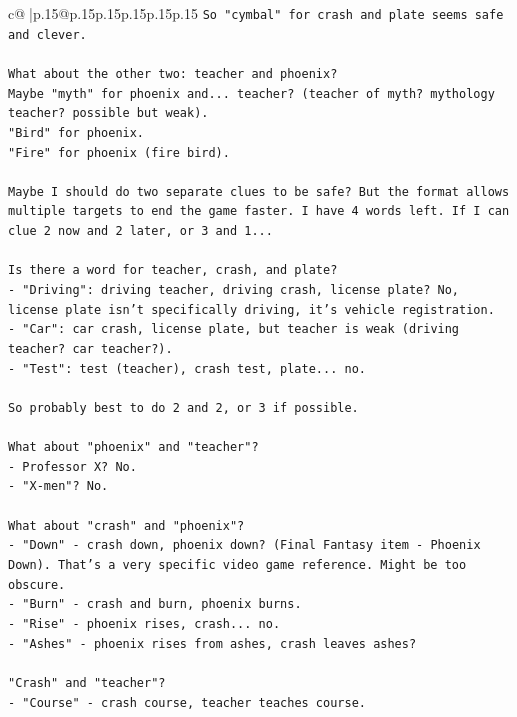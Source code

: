\documentclass{article}
\begin{document}
{\begin{supertabular}{c@{$\;$}|p{.15\linewidth}@{}p{.15\linewidth}p{.15\linewidth}p{.15\linewidth}p{.15\linewidth}p{.15\linewidth}}
{{{\texttt{So "cymbal" for crash and plate seems safe and clever.} \\
\\ 
\texttt{What about the other two: teacher and phoenix?} \\
\texttt{Maybe "myth" for phoenix and... teacher? (teacher of myth? mythology teacher? possible but weak).} \\
\texttt{"Bird" for phoenix.} \\
\texttt{"Fire" for phoenix (fire bird).} \\
\\ 
\texttt{Maybe I should do two separate clues to be safe? But the format allows multiple targets to end the game faster. I have 4 words left. If I can clue 2 now and 2 later, or 3 and 1...} \\
\\ 
\texttt{Is there a word for teacher, crash, and plate?} \\
\texttt{{-} "Driving": driving teacher, driving crash, license plate? No, license plate isn't specifically driving, it's vehicle registration.} \\
\texttt{{-} "Car": car crash, license plate, but teacher is weak (driving teacher? car teacher?).} \\
\texttt{{-} "Test": test (teacher), crash test, plate... no.} \\
\\ 
\texttt{So probably best to do 2 and 2, or 3 if possible.} \\
\\ 
\texttt{What about "phoenix" and "teacher"?} \\
\texttt{{-} Professor X? No.} \\
\texttt{{-} "X{-}men"? No.} \\
\\ 
\texttt{What about "crash" and "phoenix"?} \\
\texttt{{-} "Down" {-} crash down, phoenix down? (Final Fantasy item {-} Phoenix Down). That's a very specific video game reference. Might be too obscure.} \\
\texttt{{-} "Burn" {-} crash and burn, phoenix burns.} \\
\texttt{{-} "Rise" {-} phoenix rises, crash... no.} \\
\texttt{{-} "Ashes" {-} phoenix rises from ashes, crash leaves ashes?} \\
\\ 
\texttt{"Crash" and "teacher"?} \\
\texttt{{-} "Course" {-} crash course, teacher teaches course.} \\
}}}
\end{supertabular}}
\end{document}
